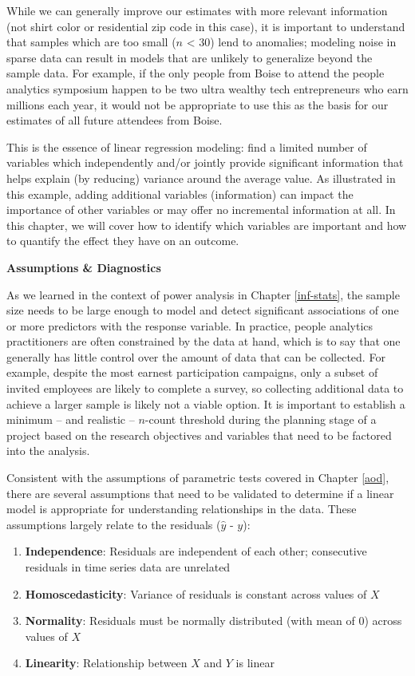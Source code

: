 \documentclass[
]{book}
\providecommand{\tightlist}{%
  \setlength{\itemsep}{0pt}\setlength{\parskip}{0pt}}
\begin{document}
While we can generally improve our estimates with more relevant information (not shirt color or residential zip code in this case), it is important to understand that samples which are too small (\(n\) \textless{} 30) lend to anomalies; modeling noise in sparse data can result in models that are unlikely to generalize beyond the sample data. For example, if the only people from Boise to attend the people analytics symposium happen to be two ultra wealthy tech entrepreneurs who earn millions each year, it would not be appropriate to use this as the basis for our estimates of all future attendees from Boise.

This is the essence of linear regression modeling: find a limited number of variables which independently and/or jointly provide significant information that helps explain (by reducing) variance around the average value. As illustrated in this example, adding additional variables (information) can impact the importance of other variables or may offer no incremental information at all. In this chapter, we will cover how to identify which variables are important and how to quantify the effect they have on an outcome.

\textbf{Assumptions \& Diagnostics}

As we learned in the context of power analysis in Chapter \ref{inf-stats}, the sample size needs to be large enough to model and detect significant associations of one or more predictors with the response variable. In practice, people analytics practitioners are often constrained by the data at hand, which is to say that one generally has little control over the amount of data that can be collected. For example, despite the most earnest participation campaigns, only a subset of invited employees are likely to complete a survey, so collecting additional data to achieve a larger sample is likely not a viable option. It is important to establish a minimum -- and realistic -- \(n\)-count threshold during the planning stage of a project based on the research objectives and variables that need to be factored into the analysis.

Consistent with the assumptions of parametric tests covered in Chapter \ref{aod}, there are several assumptions that need to be validated to determine if a linear model is appropriate for understanding relationships in the data. These assumptions largely relate to the residuals (\(\hat{y}\) - \(y\)):

\begin{enumerate}
\def\labelenumi{\arabic{enumi}.}
\tightlist
\item
  \textbf{Independence}: Residuals are independent of each other; consecutive residuals in time series data are unrelated
\item
  \textbf{Homoscedasticity}: Variance of residuals is constant across values of \(X\)
\item
  \textbf{Normality}: Residuals must be normally distributed (with mean of 0) across values of \(X\)
\item
  \textbf{Linearity}: Relationship between \(X\) and \(Y\) is linear
\end{enumerate}
\end{document}
